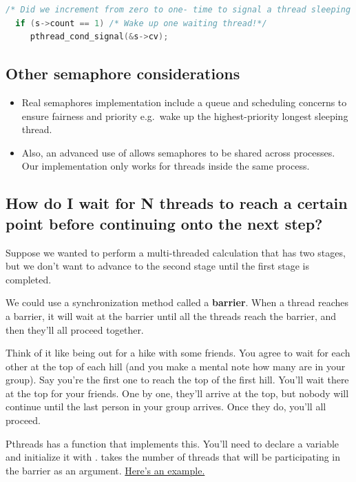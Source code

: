 \begin{lstlisting}[language=C]
  /* Did we increment from zero to one- time to signal a thread sleeping inside sem_post */
  if (s->count == 1) /* Wake up one waiting thread!*/
     pthread_cond_signal(&s->cv);
\end{lstlisting}

\subsection{Other semaphore considerations}\label{other-semaphore-considerations}

\begin{itemize}
\tightlist
\item
  Real semaphores implementation include a queue and scheduling concerns to ensure fairness and priority e.g.~wake up the highest-priority longest sleeping thread.
\item
  Also, an advanced use of  allows semaphores to be shared across processes. Our implementation only works for threads inside the same process.
\end{itemize}

\subsection{How do I wait for N threads to reach a certain point before continuing onto the next step?}\label{how-do-i-wait-for-n-threads-to-reach-a-certain-point-before-continuing-onto-the-next-step}

Suppose we wanted to perform a multi-threaded calculation that has two stages, but we don't want to advance to the second stage until the first stage is completed.

We could use a synchronization method called a \textbf{barrier}. When a thread reaches a barrier, it will wait at the barrier until all the threads reach the barrier, and then they'll all proceed together.

Think of it like being out for a hike with some friends. You agree to wait for each other at the top of each hill (and you make a mental note how many are in your group). Say you're the first one to reach the top of the first hill. You'll wait there at the top for your friends. One by one, they'll arrive at the top, but nobody will continue until the last person in your group arrives. Once they do, you'll all proceed.

Pthreads has a function  that implements this. You'll need to declare a  variable and initialize it with .  takes the number of threads that will be participating in the barrier as an argument. \href{https://github.com/angrave/SystemProgramming/wiki/Sample-program-using-pthread-barriers}{Here's an example.}

